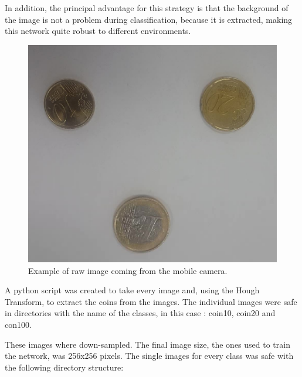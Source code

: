 \documentclass[10pt,journal,compsoc]{IEEEtran}
\begin{document}
In addition, the principal advantage for this strategy is that the background of the image is not a problem during classification, because it is extracted, making this network quite robust to different environments.


\begin{figure}[h]
\centering
\includegraphics[scale=0.08]{inference-raw}
\caption{Example of raw image coming from the mobile camera.}
\label{fig:figure1}
\end{figure}

A python script was created to take every image and, using the Hough Transform, to extract the coins from the images. The individual images were safe in directories with the name of the classes, in this case : coin10, coin20 and con100.

These images where down-sampled. The final image size, the ones used to train the network, was 256x256 pixels. The single images for every class was safe with the following directory structure:

\end{document}
